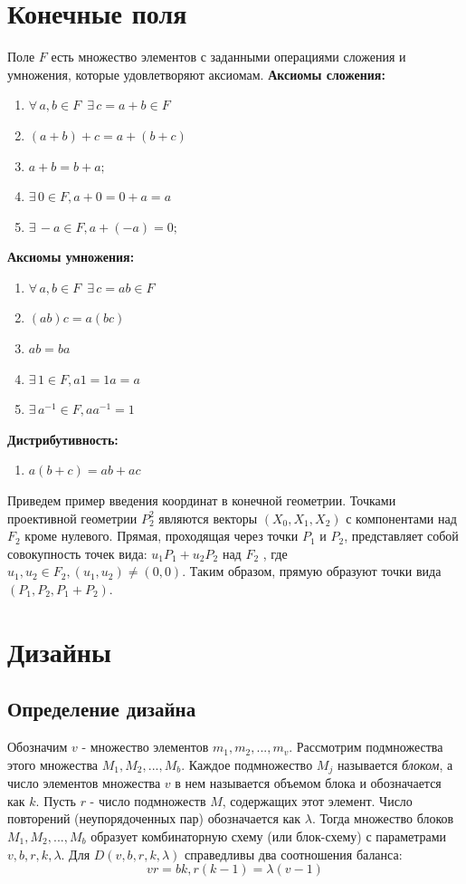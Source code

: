 \documentclass[12pt]{article}
\begin{document}
\section{Конечные поля}
Поле $F$ есть множество элементов с заданными операциями сложения и умножения, которые удовлетворяют аксиомам.\newline\newline
\textbf{Аксиомы сложения:}
\begin{enumerate}
    \item $\forall \, a, b \in F \,\,\, \exists \, c = a + b \in F$
    \item $(a + b) + c = a + (b + c)$
    \item $a + b = b + a;$
    \item $\exists \, 0 \in F, a + 0 = 0 + a = a$
    \item $\exists \, - a \in F, a + (-a) = 0;$\newline\newline\newline
\end{enumerate}
\textbf{Аксиомы умножения:}
\begin{enumerate}
    \item $\forall \, a, b \in F \,\,\, \exists \, c = ab \in F$
    \item $(ab)c = a(bc)$
    \item $ab = ba$
    \item $\exists \, 1 \in F, a1 = 1a = a$
    \item $\exists \, a^{-1} \in F, aa^{-1} = 1$
\end{enumerate}
\textbf{Дистрибутивность:}
\begin{enumerate}
    \item $a(b + c) = ab + ac$
\end{enumerate}
Приведем пример введения координат в конечной геометрии.
Точками проективной геометрии $P^2_2$ являются векторы $(X_0, X_1, X_2)$
с компонентами над $F_2$ кроме нулевого. Прямая, проходящая через
точки $P_1$ и $P_2$, представляет собой совокупность точек вида: $u_1P_1+
u_2P_2$ над $F_2$ , где $u_1, u_2 \in F_2, (u_1, u_2) \neq (0, 0)$. Таким образом, прямую образуют точки вида $(P_1, P_2, P_1 + P_2)$.
\section{Дизайны}
\subsection{Определение дизайна}
Обозначим $v$ - множество элементов $m_{1}, m_{2}, ..., m_{v}$. Рассмотрим подмножества этого множества $M_{1}, M_{2}, ..., M_{b}$. Каждое подмножество $M_{j}$ называется \textit{блоком}, а число элементов множества $v$ в нем называется объемом блока и обозначается как $k$. Пусть $r$ - число подмножеств $M$, содержащих этот элемент. Число повторений (неупорядоченных пар) обозначается как $\lambda$. Тогда множество блоков $M_{1}, M_{2}, ..., M_{b}$ образует комбинаторную схему (или блок-схему) с параметрами $v, b, r, k, \lambda$.\newline
Для $D(v, b, r, k, \lambda)$ справедливы два соотношения баланса:
$$vr = bk, r(k - 1) = \lambda(v - 1)$$
\end{document}
